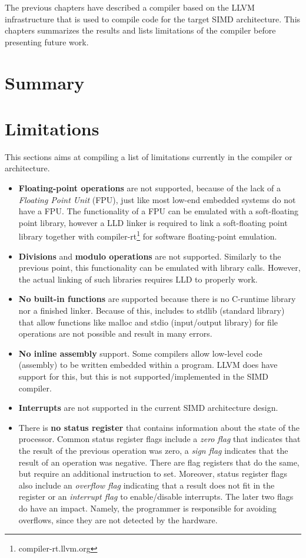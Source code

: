 The previous chapters have described a compiler based on the LLVM infrastructure that is used to compile code for the target SIMD architecture. This chapters summarizes the results and lists limitations of the compiler before presenting future work.

\section{Summary}\label{sec:summary}


\section{Limitations}\label{sec:limitations}
This sections aims at compiling a list of limitations currently in the compiler or architecture.
\begin{itemize}
    \item \textbf{Floating-point operations} are not supported, because of the lack of a \emph{Floating Point Unit} (FPU), just like most low-end embedded systems do not have a FPU. The functionality of a FPU can be emulated with a soft-floating point library, however a LLD linker is required to link a soft-floating point library together with compiler-rt\footnote{compiler-rt.llvm.org} for software floating-point emulation.
    \item \textbf{Divisions} and \textbf{modulo operations} are not supported. Similarly to the previous point, this functionality can be emulated with library calls. However, the actual linking of such libraries requires LLD to properly work.
    \item \textbf{No built-in functions} are supported because there is no C-runtime library nor a finished linker. Because of this, includes to stdlib (standard library) that allow functions like malloc and stdio (input/output library) for file operations are not possible and result in many errors.
    \item \textbf{No inline assembly} support. Some compilers allow low-level code (assembly) to be written embedded within a program. LLVM does have support for this, but this is not supported/implemented in the SIMD compiler.
    \item \textbf{Interrupts} are not supported in the current SIMD architecture design. 
    \item There is \textbf{no status register} that contains information about the state of the processor. Common status register flags include a \emph{zero flag} that indicates that the result of the previous operation was zero, a \emph{sign flag} indicates that the result of an operation was negative. There are flag registers that do the same, but require an additional instruction to set. Moreover, status register flags also include an \emph{overflow flag} indicating that a result does not fit in the register or an \emph{interrupt flag} to enable/disable interrupts. The later two flags do have an impact. Namely, the programmer is responsible for avoiding overflows, since they are not detected by the hardware. 
\end{itemize}

